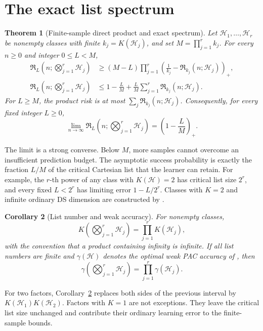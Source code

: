 \documentclass{article}
\newtheorem{theorem}{Theorem}
\newtheorem{corollary}[theorem]{Corollary}
\theoremstyle{definition}
\theoremstyle{remark}
\newcommand{\cH}{\mathcal H}
\newcommand{\Risk}{\mathfrak R}
\newcommand{\1}{\mathbf 1}
\begin{document}
\section{The exact list spectrum}
\label{sec:spectrum}

\begin{theorem}[Finite-sample direct product and exact spectrum]
\label{thm:spectrum}
Let \(\cH_1,\ldots,\cH_r\) be nonempty classes with finite \(k_j=K(\cH_j)\), and set \(M=\prod_{j=1}^r k_j\). For every \(n\ge0\) and integer \(0\le L<M\),
\begin{align}
\Risk_L\!\left(n;\bigotimes_{j=1}^r\cH_j\right)
&\ge (M-L)\prod_{j=1}^r
\left(\frac1{k_j}-\Risk_{k_j}(n;\cH_j)\right)_+,
\label{eq:finite-lower}\\
\Risk_L\!\left(n;\bigotimes_{j=1}^r\cH_j\right)
&\le 1-\frac{L}{M}
+\frac{L}{M}\sum_{j=1}^r\Risk_{k_j}(n;\cH_j).
\label{eq:finite-upper}
\end{align}
For \(L\ge M\), the product risk is at most \(\sum_j\Risk_{k_j}(n;\cH_j)\). Consequently, for every fixed integer \(L\ge0\),
\begin{equation}
\label{eq:exact-spectrum}
\lim_{n\to\infty}\Risk_L\!\left(n;\bigotimes_{j=1}^r\cH_j\right)
=\left(1-\frac{L}{M}\right)_+.
\end{equation}
\end{theorem}

The limit is a strong converse. Below \(M\), more samples cannot overcome an insufficient prediction budget. The asymptotic success probability is exactly the fraction \(L/M\) of the critical Cartesian list that the learner can retain. For example, the \(r\)-th power of any class with \(K(\cH)=2\) has critical list size \(2^r\), and every fixed \(L<2^r\) has limiting error \(1-L/2^r\). Classes with \(K=2\) and infinite ordinary DS dimension are constructed by \citet{charikar2023characterization}.

\begin{corollary}[List number and weak accuracy]
\label{cor:list-gamma}
For nonempty classes, \[ K\!\left(\bigotimes_{j=1}^r\cH_j\right)=\prod_{j=1}^rK(\cH_j), \] with the convention that a product containing infinity is infinite. If all list numbers are finite and \(\gamma(\cH)\) denotes the optimal weak PAC accuracy of \citet{brukhim2023boosting}, then \[ \gamma\!\left(\bigotimes_{j=1}^r\cH_j\right)=\prod_{j=1}^r\gamma(\cH_j). \]
\end{corollary}

For two factors, Corollary~\ref{cor:list-gamma} replaces both sides of the previous interval by \(K(\cH_1)K(\cH_2)\). Factors with \(K=1\) are not exceptions. They leave the critical list size unchanged and contribute their ordinary learning error to the finite-sample bounds.
\end{document}
